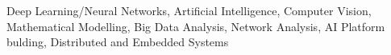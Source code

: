 \small{Deep Learning/Neural Networks, Artificial Intelligence, Computer Vision,
Mathematical Modelling, Big Data Analysis, Network Analysis, AI Platform bulding, Distributed and Embedded Systems}